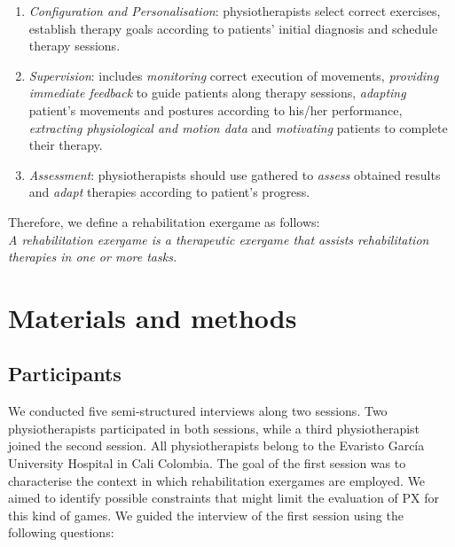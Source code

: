 \begin{enumerate}
    \item \emph{Configuration and Personalisation}: physiotherapists select correct exercises, establish therapy goals according to patients’ initial diagnosis and schedule therapy sessions.
    \item \emph{Supervision}: includes \textit{monitoring} correct execution of movements, \textit{providing immediate feedback} to guide patients along therapy sessions, \textit{adapting} patient’s movements and postures according to his/her performance, \textit{extracting physiological and motion data} and \textit{motivating} patients to complete their therapy.
    \item \emph{Assessment}: physiotherapists should use gathered to \textit{assess} obtained results and \textit{adapt} therapies according to patient’s progress.
\end{enumerate}

Therefore, we define a rehabilitation exergame as follows:\\

\emph{A rehabilitation exergame is a therapeutic exergame that assists rehabilitation therapies in one or more tasks.}

\section{Materials and methods} %
\label{sec:mats_mets_char}
\subsection{Participants}
We conducted five semi-structured interviews along two sessions. Two physiotherapists participated in both sessions, while a third physiotherapist joined the second session. All physiotherapists belong to the Evaristo Garc\'ia University Hospital in Cali Colombia. The goal of the first session was to characterise the context in which rehabilitation exergames are employed. We aimed to identify possible constraints that might limit the evaluation of \ac{PX} for this kind of games. We guided the interview of the first session using the following questions:

